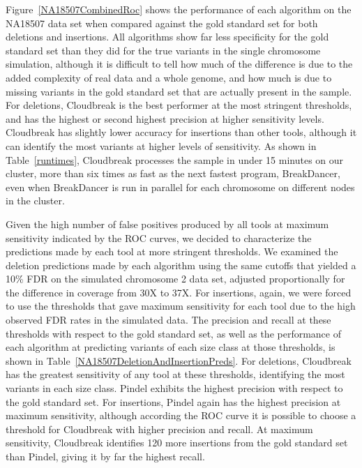 Figure~\ref{NA18507CombinedRoc} shows the performance of each algorithm on the NA18507 data set when compared against the gold standard set for both deletions and insertions. All algorithms show far less specificity for the gold standard set than they did for the true variants in the single chromosome simulation, although it is difficult to tell how much of the difference is due to the added complexity of real data and a whole genome, and how much is due to missing variants in the gold standard set that are actually present in the sample. For deletions, Cloudbreak is the best performer at the most stringent thresholds, and has the highest or second highest precision at higher sensitivity levels. Cloudbreak has slightly lower accuracy for insertions than other tools, although it can identify the most variants at higher levels of sensitivity. As shown in Table~\ref{runtimes}, Cloudbreak processes the sample in under 15 minutes on our cluster, more than six times as fast as the next fastest program, BreakDancer, even when BreakDancer is run in parallel for each chromosome on different nodes in the cluster.

Given the high number of false positives produced by all tools at maximum sensitivity indicated by the ROC curves, we decided to characterize the predictions made by each tool at more stringent thresholds. We examined the deletion predictions made by each algorithm using the same cutoffs that yielded a 10\% FDR on the simulated chromosome 2 data set, adjusted proportionally for the difference in coverage from 30X to 37X. For insertions, again, we were forced to use the thresholds that gave maximum sensitivity for each tool due to the high observed FDR rates in the simulated data. The precision and recall at these thresholds with respect to the gold standard set, as well as the performance of each algorithm at predicting variants of each size class at those thresholds, is shown in Table~\ref{NA18507DeletionAndInsertionPreds}. For deletions, Cloudbreak has the greatest sensitivity of any tool at these thresholds, identifying the most variants in each size class. Pindel exhibits the highest precision with respect to the gold standard set. For insertions, Pindel again has the highest precision at maximum sensitivity, although according the ROC curve it is possible to choose a threshold for Cloudbreak with higher precision and recall. At maximum sensitivity, Cloudbreak identifies 120 more insertions from the gold standard set than Pindel, giving it by far the highest recall.

